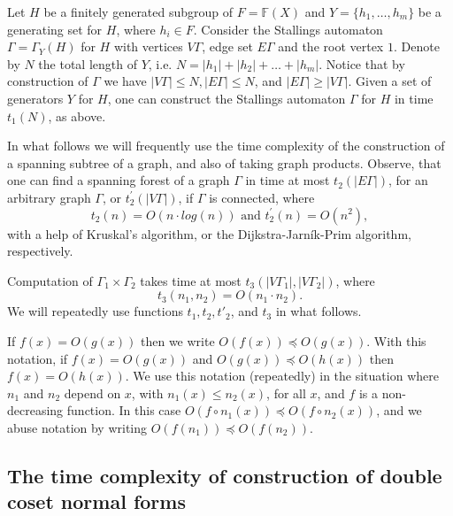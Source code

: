 \documentclass[a4paper,12pt]{article}
\newcommand{\G}{\Gamma }
\numberwithin{equation}{section}
\numberwithin{figure}{section}
\newcommand{\FF}{\ensuremath{\mathbb{F}}}
\begin{document}
Let $H$ be a finitely generated subgroup of $F=\FF(X)$ and
$Y=\{h_1,\ldots ,h_m\}$ be a generating set for $H$, where $h_i\in
F$. Consider the Stallings automaton $\G = \G_Y(H)$ for $H$ with
vertices $V\G$, edge set $E\G$ and the root vertex $1$. Denote by
$N$ the total length of $Y$, i.e. $N = |h_1| + |h_2| + \ldots +
|h_m|$. Notice that by construction of $\G$ we have $|V\G| \le N,
|E\G| \le N$, and $|E \G| \ge |V \G|$.
Given a set of generators $Y$ for $H$, one can construct the
Stallings automaton $\G$ for $H$ in time $t_1(N)$, as above.

In what follows we will  frequently  use the time complexity of the
 construction of a spanning subtree of a graph, and also of taking graph
products.
Observe, that one can find a spanning forest of a graph $\G$ in
time at most $t_2(|E\G|)$, for an arbitrary graph $\G$,
or $t^{\prime}_2(|V\G|)$, if $\G$ is  connected, where
\begin{equation}\label{t2}
t_2(n) = O(n \cdot log(n)) {\textrm{ and }} t^{\prime}_2(n) =
O(n^2),
\end{equation}
with a help of Kruskal's algorithm, or
the Dijkstra-Jarn\'{i}k-Prim  algorithm, respectively.

Computation of $\G_1 \times \G_2$ takes time at most $t_3(|V\G_1|,
|V\G_2|)$, where
\begin{equation}\label{t3}
t_3(n_1, n_2) = O(n_1 \cdot n_2).
\end{equation}
We will repeatedly use  functions $t_1, t_2, t'_2$,
and $t_3$ in what follows.

If $f(x)=O(g(x))$ then we write $O(f(x))\preceq O(g(x))$. With
this notation, if $f(x)=O(g(x))$ and $O(g(x))\preceq O(h(x))$ then
$f(x)=O(h(x))$.  We use this notation (repeatedly) in the situation
where $n_1$ and $n_2$ depend on $x$, with $n_1(x)\le n_2(x)$, for all $x$,
and $f$ is a non-decreasing function. In this case
$O(f\circ n_1(x))\preceq O(f\circ n_2(x))$, and we abuse notation by
writing $O(f(n_1)) \preceq O(f(n_2))$.


\subsection{The time complexity of construction of double coset normal forms}\label{sub:doubleCo_nf}
\end{document}
